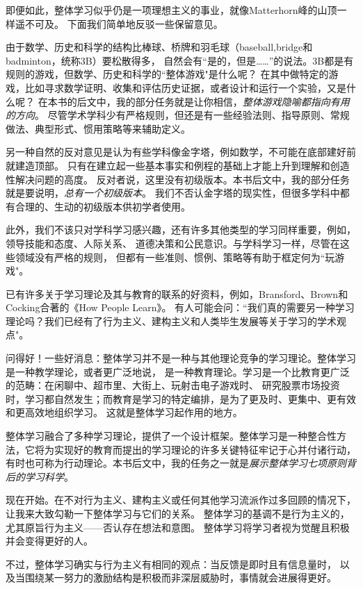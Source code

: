 即便如此，整体学习似乎仍是一项理想主义的事业，就像Matterhorn峰的山顶一样遥不可及。
下面我们简单地反驳一些保留意见。

由于数学、历史和科学的结构比棒球、桥牌和羽毛球（baseball,bridge和badminton，统称3B）要松散得多，
自然会有“是的，但是……”的说法。3B都是有规则的游戏，但数学、历史和科学的``整体游戏"是什么呢？
在其中做特定的游戏，比如寻求数学证明、收集和评估历史证据，或者设计和运行一个实验，又是什么呢？
在本书的后文中，我的部分任务就是让你相信，\textit{整体游戏隐喻都指向有用的方向}。
尽管学术学科少有严格规则，但还是有一些经验法则、指导原则、常规做法、典型形式、惯用策略等来辅助定义。

另一种自然的反对意见是认为有些学科像金字塔，例如数学，不可能在底部建好前就建造顶部。
只有在建立起一些基本事实和例程的基础上才能上升到理解和创造性解决问题的高度。
反对者说，这里没有初级版本。本书后文中，我的部分任务就是要说明，\textit{总有一个初级版本}。
我们不否认金字塔的现实性，但很多学科中都有合理的、生动的初级版本供初学者使用。

此外，我们不该只对学科学习感兴趣，还有许多其他类型的学习同样重要，例如，领导技能和态度、人际关系、
道德决策和公民意识。与学科学习一样，尽管在这些领域没有严格的规则，
但都有一些准则、惯例、策略等有助于框定何为``玩游戏"。

已有许多关于学习理论及其与教育的联系的好资料，例如，Bransford、Brown和Cocking合著的《How People Learn》。
有人可能会问：``我们真的需要另一种学习理论吗？我们已经有了行为主义、建构主义和人类毕生发展等关于学习的学术观点"。

问得好！一些好消息：整体学习并不是一种与其他理论竞争的学习理论。整体学习是一种教学理论，或者更广泛地说，
是一种教育理论。学习是一个比教育更广泛的范畴：在闲聊中、超市里、大街上、玩射击电子游戏时、
研究股票市场投资时，学习都自然发生；而教育是学习的特定编排，是为了更及时、更集中、更有效和更高效地组织学习。
这就是整体学习起作用的地方。

整体学习融合了多种学习理论，提供了一个设计框架。整体学习是一种整合性方法，它将为实现好的教育而提出的学习理论的许多关键特征牢记于心并付诸行动，有时也可称为行动理论。本书后文中，我的任务之一就是\textit{展示整体学习七项原则背后的学习科学}。

现在开始。在不对行为主义、建构主义或任何其他学习流派作过多回顾的情况下，让我来大致勾勒一下整体学习与它们的关系。
整体学习的基调不是行为主义的，尤其原旨行为主义——否认存在想法和意图。
整体学习将学习者视为觉醒且积极并会变得更好的人。

不过，整体学习确实与行为主义有相同的观点：当反馈是即时且有信息量时，
以及当围绕某一努力的激励结构是积极而非深层威胁时，事情就会进展得更好。


